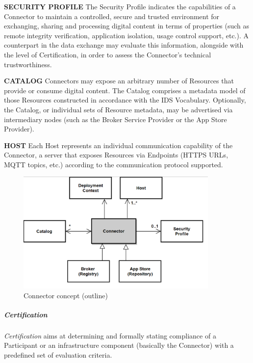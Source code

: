 \textbf{SECURITY PROFILE} The Security Profile indicates the capabilities of a Connector to maintain a controlled, secure and trusted environment for exchanging, sharing and processing digital content in terms of properties (such as remote integrity verification, application isolation, usage control support, etc.). A counterpart in the data exchange may evaluate this information, alongside with the level of Certification, in order to assess the Connector’s technical trustworthiness. 

\textbf{CATALOG} Connectors may expose an arbitrary number of Resources that provide or consume digital content. The Catalog comprises a metadata model of those Resources constructed in accordance with the IDS Vocabulary. Optionally, the Catalog, or individual sets of Resource metadata, may be advertised via intermediary nodes (such as the Broker Service Provider or the App Store Provider).

\textbf{HOST} Each Host represents an individual communication capability of the Connector, a server that exposes Resources via Endpoints (HTTPS URLs, MQTT topics, etc.) according to the communication protocol supported.




\begin{figure}[H]
	\begin{Center}
		\includegraphics[width=3.92in,height=2.38in]{./media/image50.png}
		\caption{Connector concept (outline)}
		\label{fig:Connector_concept_outline}
	\end{Center}
\end{figure}




\subparagraph*{Certification}
\textit{Certification} aims at determining and formally stating compliance of a Participant or an infrastructure component (basically the Connector) with a predefined set of evaluation criteria. 

